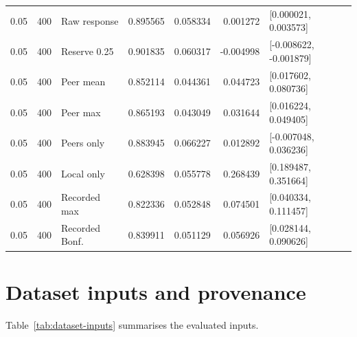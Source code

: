 {\begin{longtable}{rrlrrrrl}
0.05 & 400 & Raw response & 0.895565 & 0.058334 & 0.001272 & \multicolumn{2}{l}{[0.000021, 0.003573]}\\
0.05 & 400 & Reserve 0.25 & 0.901835 & 0.060317 & -0.004998 & \multicolumn{2}{l}{[-0.008622, -0.001879]}\\
0.05 & 400 & Peer mean & 0.852114 & 0.044361 & 0.044723 & \multicolumn{2}{l}{[0.017602, 0.080736]}\\
0.05 & 400 & Peer max & 0.865193 & 0.043049 & 0.031644 & \multicolumn{2}{l}{[0.016224, 0.049405]}\\
0.05 & 400 & Peers only & 0.883945 & 0.066227 & 0.012892 & \multicolumn{2}{l}{[-0.007048, 0.036236]}\\
0.05 & 400 & Local only & 0.628398 & 0.055778 & 0.268439 & \multicolumn{2}{l}{[0.189487, 0.351664]}\\
0.05 & 400 & Recorded max & 0.822336 & 0.052848 & 0.074501 & \multicolumn{2}{l}{[0.040334, 0.111457]}\\
0.05 & 400 & Recorded Bonf. & 0.839911 & 0.051129 & 0.056926 & \multicolumn{2}{l}{[0.028144, 0.090626]}\\
\midrule
\end{longtable}}

\section{Dataset inputs and provenance} 
\label{app:data} 
\setcounter{table}{0} 
Table~\ref{tab:dataset-inputs} summarises the evaluated inputs.

